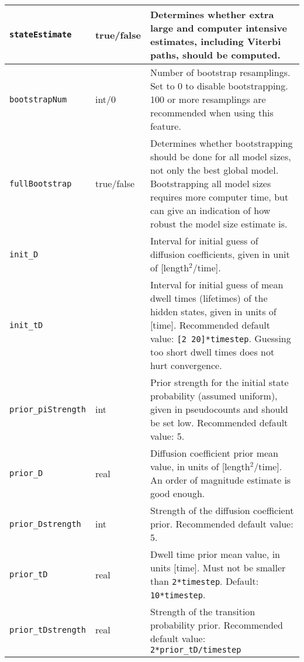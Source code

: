 \begin{longtable}{|m{}|>{\centering\arraybackslash}m{}|m{}|}
\texttt{stateEstimate}				&	  true/false						&		Determines whether extra large and computer intensive estimates, including Viterbi paths, should be computed.\\[0.5ex]  \hline 
\texttt{bootstrapNum}			&	  int/0							&		Number of bootstrap resamplings. Set to 0 to disable bootstrapping. 100 or more resamplings are recommended when using this feature.\\ [0.5ex]  \hline 
\texttt{fullBootstrap}				&	  true/false						&		Determines whether bootstrapping should be done for all model sizes, not only the best global model. Bootstrapping all model sizes requires more computer time, but can give an indication of how robust the model size estimate is.\\[0.5ex]  \hline 
\texttt{init\_D	}						&	  [real real]					&		Interval for initial guess of diffusion coefficients, given in unit of [length$^2$/time]. \\ [0.5ex]  \hline 
\texttt{init\_tD}						&	  [real real]					&		Interval for initial guess of mean dwell times (lifetimes) of the hidden states, given in units of [time]. Recommended default value: \mbox{\texttt{[2 20]*timestep}}. Guessing too short dwell times does not hurt convergence.\\ [0.5ex]  \hline 
\texttt{prior\_piStrength}		&	  int									&		Prior strength for the initial state probability (assumed uniform), given in pseudocounts and should be set low. Recommended default value: 5.\\ [0.5ex]  \hline 
\texttt{prior\_D}						&	  real								&		Diffusion coefficient prior mean value, in units of  [length$^2$/time]. An order of magnitude estimate is good enough.\\ [0.5ex]  \hline 
\texttt{prior\_Dstrength}			&	  int									&		Strength of the diffusion coefficient prior. Recommended default value: 5.\\ [0.5ex]  \hline 
\texttt{prior\_tD}						&	  real					&		Dwell time prior mean value, in units [time]. Must not be smaller than \texttt{2*timestep}. Default: \texttt{10*timestep}. \\ [0.5ex]  \hline 
\texttt{prior\_tDstrength}		&	  real		&		Strength of the transition probability prior. Recommended default value: \texttt{2*prior\_tD/timestep}\\ [1ex] %
\end{longtable}


\newpage


